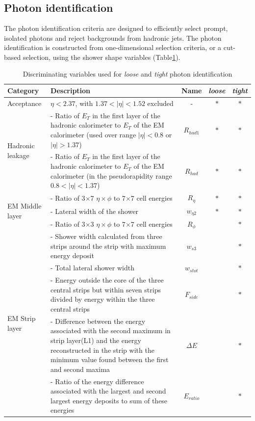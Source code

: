 \documentclass[a4paper, oneside]{book}
\begin{document}
			\subsection{Photon identification}
			The photon identification criteria \cite{El ph reco} are designed to efficiently select prompt, isolated photons and reject backgrounds from hadronic jets. The photon identification is constructed from one-dimensional selection criteria, or a cut-based selection, using the shower shape variables (Table\ref{tab:ph parameters}).

			\begin{table}[h!]
				\centering
				\begin{tabular}{lp{6cm}ccc}
					\toprule[1.5pt]
					\textbf{Category} & \textbf{Description} & \textbf{Name} & \textbf{\textit{loose}} & \textbf{\textit{tight}}\\
					\midrule
					Acceptance & $\eta<2.37$, with $1.37<|\eta|<1.52$ excluded & - & $\ast$ & $\ast$ \\
					\midrule
					\multirow[t]{2}{*}{Hadronic leakage} 
					& {- Ratio of $E_T$ in the first layer of the hadronic calorimeter to $E_T$ of the EM calorimeter (used over range $|\eta| < 0.8$ or $|\eta| > 1.37$)} & $R_{had1}$ & $\ast$ & $\ast$  \\ 
					& - Ratio of $E_T$ in the first layer of the hadronic calorimeter to $E_T$ of the EM calorimeter (in the pseudorapidity range $0.8 < |\eta| < 1.37$) & $R_{had}$  & $\ast$ & $\ast$ \\
					\midrule
					\multirow[t]{3}{*}{EM Middle layer}
					& - Ratio of 3$\times$7 $\eta\times\phi$ to 7$\times$7 cell energies & $R_{\eta}$ & $\ast$ & $\ast$ \\
					& - Lateral width of the shower & $w_{\eta2}$ & $\ast$ & $\ast$ \\
					& - Ratio of 3$\times$3 $\eta\times\phi$ to 7$\times$7 cell energies & $R_{\phi}$ &  & $\ast$ \\
					\midrule
					\multirow[t]{5}{*}{EM Strip layer}
					& - Shower width calculated from three strips around the strip with maximum energy deposit & $w_{s3}$ &  & $\ast$ \\
					& - Total lateral shower width & $w_{stot}$ &  & $\ast$ \\
					& - Energy outside the core of the three central strips but within seven strips divided by energy within the three central strips & $F_{side}$ &  & $\ast$ \\
					& - Difference between the energy associated with the second maximum in strip layer(L1) and the energy reconstructed in the strip with the minimum value found between the first and second maxima & $\Delta E$ &  & $\ast$ \\
					& - Ratio of the energy difference associated with the largest and second largest energy deposits to sum of these energies & $E_{ratio}$ &  & $\ast$ \\
					
					\bottomrule[1.5pt]
				\end{tabular}
				\caption{Discriminating variables used for \textit{loose} and \textit{tight} photon identification \cite{Identification}}
				\label{tab:ph parameters}
			\end{table}
		
\end{document}
